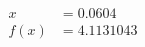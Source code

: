 \documentclass[preview]{standalone}
\begin{document}
\begin{align*}
x &= 0.0604\\f(x) &= 4.1131043
\end{align*}
\end{document}
